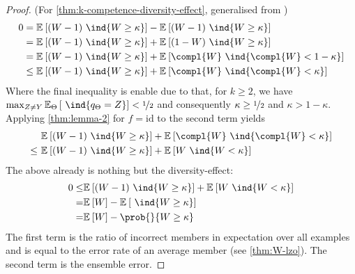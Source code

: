 \documentclass[../main.tex]{subfiles}
\begin{document}
\begin{proof} (For \cref{thm:k-competence-diversity-effect}, generalised from \cite{theisen_WhenAreEnsembles_2023})
   \begin{align*}
        0 &= \mathbb{E}_{}\left[ (W-1)~\ind{W \geq \kappa} \right]  - \mathbb{E}_{}\left[ (W-1) ~\ind{W \geq \kappa} \right]  \\
        &= \mathbb{E}_{}\left[ (W-1)~\ind{W \geq \kappa} \right]  + \mathbb{E}_{}\left[ (1-W)~\ind{W \geq \kappa} \right]  \\
        &= \mathbb{E}_{}\left[ (W-1)~\ind{W \geq \kappa} \right]  + \mathbb{E}_{}\left[  \compl{W} ~\ind{\compl{W} < 1-\kappa} \right]   \\
        &\leq \mathbb{E}_{}\left[ (W-1)~\ind{W \geq \kappa} \right]  + \mathbb{E}_{}\left[  \compl{W} ~\ind{\compl{W} < \kappa} \right]   \\
    \end{align*}
Where the final inequality is enable due to that, for $k \geq 2$, we have $\max_{Z \not= Y} \mathbb{E}_{\Theta}\left[ ~\ind{q_{\Theta} = Z} \right] < \nicefrac{1}{2}$ and consequently $\kappa \geq \nicefrac{1}{2}$ and $\kappa > 1-\kappa$.
    Applying \cref{thm:lemma-2} for $f = \text{id}$ to the second term yields
    \begin{align*}
        & \mathbb{E}_{}\left[ (W-1)~\ind{W \geq \kappa} \right]  + \mathbb{E}_{}\left[  \compl{W} ~\ind{\compl{W} < \kappa} \right]   \\  
        \leq~ &  \mathbb{E}_{}\left[ (W-1)~\ind{W \geq \kappa} \right]  + \mathbb{E}_{}\left[ W ~\ind{W < \kappa} \right] 
    \end{align*}
    The above already is nothing but the diversity-effect:
    \begin{align*}
        0 \leq& \mathbb{E}_{}\left[ (W-1)~\ind{W \geq \kappa} \right]  + \mathbb{E}_{}\left[ W ~\ind{W < \kappa} \right]  \\
        = & \mathbb{E}_{}\left[ W  \right]  - \mathbb{E}_{}\left[ ~\ind{W \geq \kappa} \right]  \\
        = & \mathbb{E}_{}\left[ W \right]  - \prob{}{W \geq \kappa}
    \end{align*}
    The first term is the ratio of incorrect members in expectation over all examples and is equal to the error rate of an average member (see \cref{thm:W-lzo}).
    The second term is the ensemble error. 
\end{proof}
\end{document}
